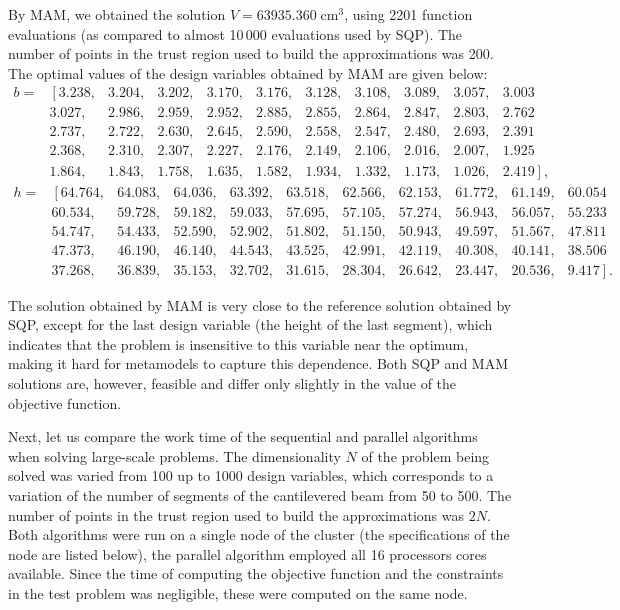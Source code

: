 \documentclass[runningheads,a4paper]{llncs}
\begin{document}
By MAM, we obtained the solution $V = 63935.360\; \text{cm}^3$, using 2201
function evaluations (as compared to almost 10\,000 evaluations used by SQP).
The number of points in the trust region used to build the approximations was
200. The optimal values of the design variables obtained by MAM are given
below:
\[
\begin{matrix}
	b=&	\left[3.238,\right.&3.204,&3.202,&3.170,&3.176,&3.128,&3.108,&3.089,&3.057,&3.003 \\
		& 3.027,&2.986,&2.959,&2.952,&2.885,&2.855,&2.864,&2.847,&2.803,&2.762 \\
		& 2.737,&2.722,&2.630,&2.645,&2.590,&2.558,&2.547,&2.480,&2.693,&2.391 \\
		& 2.368,&2.310,&2.307,&2.227,&2.176,&2.149,&2.106,&2.016,&2.007,&1.925 \\
		& 1.864,&1.843,&1.758,&1.635,&1.582,&1.934,&1.332,&1.173,&1.026,&\left.2.419\right],
\end{matrix}
\]
\[
\begin{matrix}
	h=& \left[64.764,\right.&64.083,&64.036,&63.392,&63.518,&62.566,&62.153,&61.772,&61.149,& 60.054  \\
		& 60.534,&59.728,&59.182,&59.033,&57.695,&57.105,&57.274,&56.943,&56.057,&55.233  \\
		& 54.747,&54.433,&52.590,&52.902,&51.802,&51.150,&50.943,&49.597,&51.567,&47.811  \\
		& 47.373,&46.190,&46.140,&44.543,&43.525,&42.991,&42.119,&40.308,&40.141,&38.506  \\
		& 37.268,&36.839,&35.153,&32.702,&31.615,&28.304,&26.642,&23.447,&20.536,& \left.9.417\right].
\end{matrix}
\]

The solution obtained by MAM is very close to the reference solution obtained
by SQP, except for the last design variable (the height of the last segment),
which indicates that the problem is insensitive to this variable near the
optimum, making it hard for metamodels to capture this dependence. Both SQP
and MAM solutions are, however, feasible and differ only slightly in the value
of the objective function.

Next, let us compare the work time of the sequential and parallel algorithms
when solving large-scale problems. The dimensionality $N$ of the problem being
solved was varied from 100 up to 1000 design variables, which corresponds to a
variation of the number of segments of the cantilevered beam from 50 to 500.
The number of points in the trust region used to build the approximations was
$2 N$. Both algorithms were run on a single node of the cluster (the
specifications of the node are listed below), the parallel algorithm employed
all 16 processors cores available. Since the time of computing the objective
function and the constraints in the test problem was negligible, these were
computed on the same node.
\end{document}

